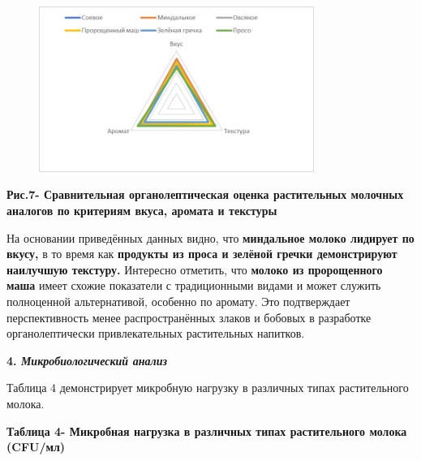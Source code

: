 \begin{figure}[H]
	\centering
	\includegraphics[width=0.8\textwidth]{media/pish/image57}
	\caption*{}
\end{figure}


{\bfseries Рис.7- Сравнительная органолептическая оценка растительных
молочных аналогов по критериям вкуса, аромата и текстуры}

На основании приведённых данных видно, что {\bfseries миндальное молоко
лидирует по вкусу,} в то время как {\bfseries продукты из проса и зелёной
гречки демонстрируют наилучшую текстуру.} Интересно отметить, что
{\bfseries молоко из пророщенного маша} имеет схожие показатели с
традиционными видами и может служить полноценной альтернативой, особенно
по аромату. Это подтверждает перспективность менее распространённых
злаков и бобовых в разработке органолептически привлекательных
растительных напитков.

{\bfseries 4. \emph{Микробиологический анализ}}

Таблица 4 демонстрирует микробную нагрузку в различных типах
растительного молока.

{\bfseries Таблица 4- Микробная нагрузка в различных типах растительного
молока (CFU/мл)}

